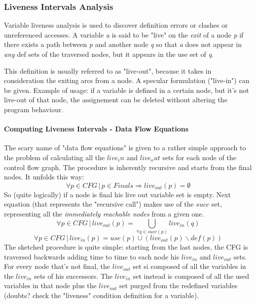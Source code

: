                 \subsubsection{Liveness Intervals Analysis}
                    Variable liveness analysis is used to discover definition errors or clashes or unreferenced accesses. A variable \emph{a} is said to be "live" on 
					the \emph{exit} of a node \emph{p} if there exists a path between \emph{p} and another node \emph{q} so that \emph{a} does not appear in 
					\emph{any} def sets of the traversed nodes, but it appears in the use set of \emph{q}.

                    This definition is usually referred to as "live-out", because it takes in consideration the exiting arcs from a node. A specular formulation 
					("live-in") can be given. Example of usage: if a variable is defined in a certain node, but it's not live-out of that node, the assignement can 
					be deleted without altering the program behaviour.
                    
                    \paragraph{Computing Liveness Intervals - Data Flow Equations}
                        The scary name of "data flow equations" is given to a rather simple approach to the problem of calculating all the $live_in$ and $live_out$ 
						sets for each node of the control flow graph. The procedure is inherently recursive and starts from the final nodes. It unfolds this way:
                        \begin{equation}
                            \forall p \in CFG \,\vert\, p \in Finals \Rightarrow live_{out}(p) = \emptyset
                        \end{equation}
                        So (quite logically) if a node is final his live out variable set is empty. Next equation (that represents the "recursive call") makes use of 
						the $succ$ set, representing all the \emph{immediately reachable nodes} from a given one.
                        \begin{equation}
                            \forall p \in CFG \,\vert\, live_{out}(p) = \bigcup\limits_{\forall q \in succ(p)} live_{in}(q) 
                        \end{equation}
                        \begin{equation}
                            \forall p \in CFG \,\vert\, live_{in}(p) = use(p) \cup (live_{out}(p) \backslash def(p))
                        \end{equation}
                        The sketched procedure is quite simple: starting from the last nodes, the CFG is traversed backwards adding time to time to each node his 
						$live_{in}$ and $live_{out}$ sets. For every node that's not final, the $live_{out}$ set si composed of all the variables in the $live_{in}$ 
						sets of his successors. The $live_{in}$ set instead is composed of all the used variables in that node plus the $live_{out}$ set purged from 
						the redefined variables (doubts? check the "liveness" condition definition for a variable).
                        
